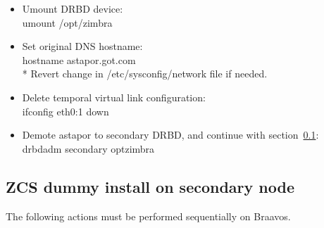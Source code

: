 \documentclass[a4paper, 12pt]{book}
\begin{document}
\begin{itemize}
	\item Umount DRBD device:\\
		umount   /opt/zimbra
	
	\item Set original DNS hostname:\\
		hostname astapor.got.com\\
		* Revert change in /etc/sysconfig/network file if needed.
	
	\item Delete temporal virtual link configuration:\\
		ifconfig eth0:1 down
	
	\item Demote astapor to secondary DRBD, and continue with section~\ref{sec:dummyinstall}:\\
		drbdadm secondary optzimbra
		
\end{itemize}


\subsection{ZCS dummy install on secondary node}
\label{sec:dummyinstall}

\noindent The following actions must be performed sequentially on Braavos.
\end{document}
